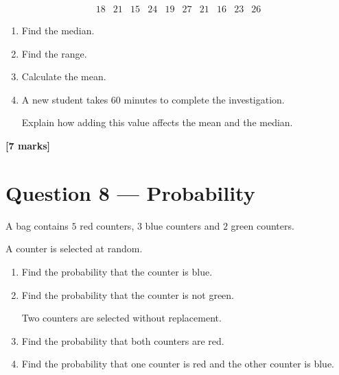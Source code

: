 	\[
	\begin{array}{cccccccccc}
		18 & 21 & 15 & 24 & 19 & 27 & 21 & 16 & 23 & 26
	\end{array}
	\]
	
	\begin{enumerate}
		\item[(a)] Find the median.
		
		\vspace{15mm}
		
		\item[(b)] Find the range.
		
		\vspace{10mm}
		
		\item[(c)] Calculate the mean.
		
		\vspace{15mm}
		
		\item[(d)] A new student takes \(60\) minutes to complete the
		investigation.
		
		Explain how adding this value affects the mean and the median.
	\end{enumerate}
	
	\vfill
	
	\noindent
	\textbf{[7 marks]}
	
	\newpage
	
	
	\section*{Question 8 --- Probability}
	
	A bag contains \(5\) red counters, \(3\) blue counters and \(2\) green
	counters.
	
	A counter is selected at random.
	
	\begin{enumerate}
		\item[(a)] Find the probability that the counter is blue.
		
		\vspace{12mm}
		
		\item[(b)] Find the probability that the counter is not green.
		
		\vspace{15mm}
		
		Two counters are selected without replacement.
		
		\item[(c)] Find the probability that both counters are red.
		
		\vspace{15mm}
		
		\item[(d)] Find the probability that one counter is red and the other
		counter is blue.
	\end{enumerate}
	
